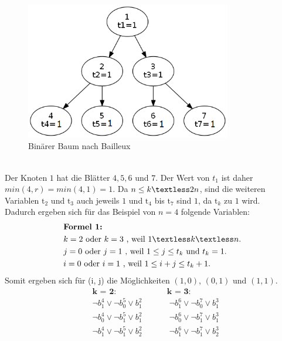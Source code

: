 \documentclass[a4,abstract=on]{scrartcl}
\begin{document}
\begin{figure}[H]
\centering
\includegraphics[width=9cm]{bailleux.png}
\caption{Binärer Baum nach Bailleux}
\label{fig:baum}
\end{figure}
\ \\
Der Knoten $1$ hat die Blätter $4,5,6$ und $7$. Der Wert von $t_1$ ist daher $min(4,r) = min(4,1) = 1$. Da $n \leq k \textless 2n$, sind die weiteren Variablen $\text{t}_2$ und $\text{t}_3$ auch jeweils $1$ und $\text{t}_4$ bis $\text{t}_7$ sind $1$, da $\text{t}_k$ zu $1$ wird.
\ \\
Dadurch ergeben sich für das Beispiel von $n=4$ folgende Variablen:\\
\begin{align*}
&\textbf{Formel 1:}\\
&k=2 \text{ oder } k=3 \text{ , weil } 1 \textless k \textless n.\\
&j=0 \text{ oder } j=1 \text{ , weil } 1 \leq j \leq t_k \text{ und } t_k = 1.\\
&i=0 \text{ oder } i=1 \text{ , weil } 1\leq i+j \leq t_{k}+1.\\
\end{align*}
Somit ergeben sich für (i, j) die Möglichkeiten $(1,0)$, $(0,1)$ und $(1,1)$.\\
\begin{align*}
&\textbf{k = 2:} {~~~~~~~~~~~~~~~~~~~~~~~~~~~~} \textbf{k = 3:}\\
&\neg b_1^4 \vee \neg b_0^5 \vee b_1^2 {~~~~~~~~~~~~~~~} \neg b_1^6 \vee \neg b_0^7 \vee b_1^3\\
&\neg b_0^4 \vee \neg b_1^5 \vee b_1^2 {~~~~~~~~~~~~~~~} \neg b_0^6 \vee \neg b_1^7 \vee b_1^3\\
&\neg b_1^4 \vee \neg b_1^5 \vee b_2^2 {~~~~~~~~~~~~~~~} \neg b_1^6 \vee \neg b_1^7 \vee b_2^3\\
\end{align*}
\end{document}
